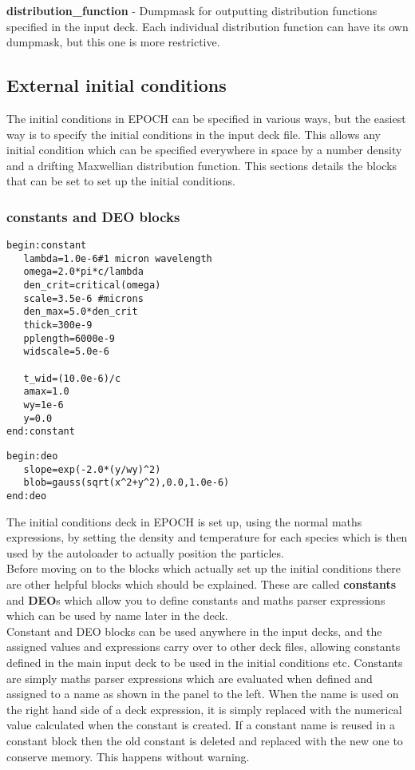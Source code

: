 \documentclass[12pt]{article}
\newcommand{\emphtext}{\color{warwickdark} \fontfamily{phv}\selectfont\Large\bf}
\newcommand{\boxverbatim}[1]{\begin{Verbatim}[obeytabs=true,frame=single,
  framerule=0.5mm,rulecolor=\color{warwickmid},label=#1]}
\newcommand{\inlineemph}[1]{{\color{warwicklight} \bf{#1}}}
\newcommand{\nEPOCH}{{\color{warwickdark}\fontfamily{phv}\selectfont EPOCH}}
\newcommand{\EPOCH}{{\nEPOCH} }
\begin{document}
{\emphtext distribution\_function} - Dumpmask for outputting distribution
functions specified in the input deck. Each individual distribution function
can have its own dumpmask, but this one is more restrictive.\\

\subsection{External initial conditions}

The initial conditions in \EPOCH can be specified in various ways, but the
easiest way is to specify the initial conditions in the input deck file. This
allows any initial condition which can be specified everywhere in space by a
number density and a drifting Maxwellian distribution function. This sections
details the blocks that can be set to set up the initial conditions.

\subsubsection{\inlineemph{constants} and \inlineemph{DEO} blocks}

\boxverbatim{constant block}
begin:constant
   lambda=1.0e-6#1 micron wavelength
   omega=2.0*pi*c/lambda
   den_crit=critical(omega)
   scale=3.5e-6 #microns
   den_max=5.0*den_crit
   thick=300e-9
   pplength=6000e-9
   widscale=5.0e-6

   t_wid=(10.0e-6)/c
   amax=1.0
   wy=1e-6
   y=0.0
end:constant
\end{Verbatim}

\boxverbatim{deo block}
begin:deo
   slope=exp(-2.0*(y/wy)^2)
   blob=gauss(sqrt(x^2+y^2),0.0,1.0e-6)
end:deo
\end{Verbatim}

The initial conditions deck in \EPOCH is set up, using the normal maths
expressions, by setting the density and temperature for each species which is
then used by the autoloader to actually position the particles.\\

Before moving on to the blocks which actually set up the initial conditions
there are other helpful blocks which should be explained. These are called
\inlineemph{constants} and \inlineemph{DEO}s which allow you to define
constants and maths parser expressions which can be used by name later in the
deck.\\

Constant and DEO blocks can be used anywhere in the input decks, and the
assigned values and expressions carry over to other deck files, allowing
constants defined in the main input deck to be used in the initial conditions
etc. Constants are simply maths parser expressions which are evaluated when
defined and assigned to a name as shown in the panel to the left. When the name
is used on the right hand side of a deck expression, it is simply replaced with
the numerical value calculated when the constant is created.  If a constant
name is reused in a constant block then the old constant is deleted and
replaced with the new one to conserve memory. This happens without warning.\\
\end{document}
